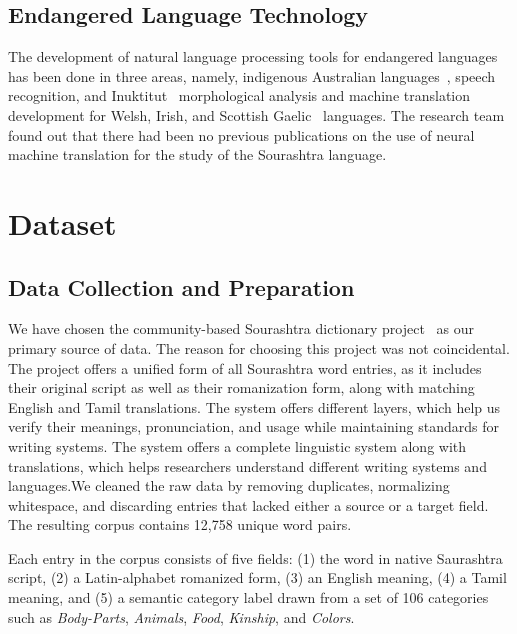 \documentclass[conference]{IEEEtran}
\begin{document}
\subsection{Endangered Language Technology}
The development of natural language processing tools for endangered languages has been done in three areas, namely, indigenous Australian languages~\cite{foley2018building}, speech recognition, and Inuktitut~\cite{micher2017improving} morphological analysis and machine translation development for Welsh, Irish, and Scottish Gaelic~\cite{dowling2020smt} languages. The research team found out that there had been no previous publications on the use of neural machine translation for the study of the Sourashtra language.

\section{Dataset}\label{sec:dataset}

\subsection{Data Collection and Preparation}
We have chosen the community-based Sourashtra dictionary project~\cite{sourashtra_dict}  as our primary source of data. The reason for choosing this project was not coincidental. The project offers a unified form of all Sourashtra word entries, as it includes their original script as well as their romanization form, along with matching English and Tamil translations. The system offers different layers, which help us verify their meanings, pronunciation, and usage while maintaining standards for writing systems. The system offers a complete linguistic system along with translations, which helps researchers understand different writing systems and languages.We cleaned the raw data by removing duplicates, normalizing whitespace, and discarding entries that lacked either a source or a target field. The resulting corpus contains 12,758 unique word pairs.

Each entry in the corpus consists of five fields: (1) the word in native Saurashtra script, (2) a Latin-alphabet romanized form, (3) an English meaning, (4) a Tamil meaning, and (5) a semantic category label drawn from a set of 106 categories such as \textit{Body-Parts}, \textit{Animals}, \textit{Food}, \textit{Kinship}, and \textit{Colors}.
\end{document}
